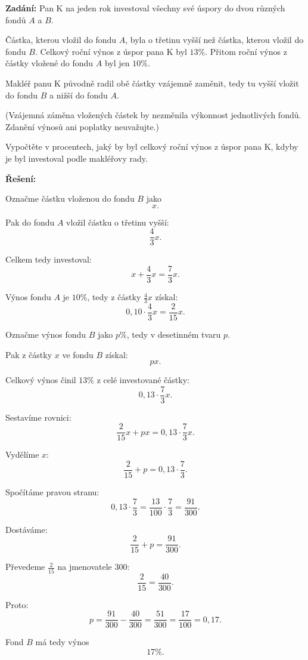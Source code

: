 \documentclass[12pt,a4paper]{article}
\begin{document}
\textbf{Zadání:}  
Pan K na jeden rok investoval všechny své úspory do dvou různých fondů \(A\) a \(B\).

Částka, kterou vložil do fondu \(A\), byla o třetinu vyšší než částka, kterou vložil do fondu \(B\).  
Celkový roční výnos z úspor pana K byl \(13\%\). Přitom roční výnos z částky vložené do fondu \(A\) byl jen \(10\%\).

Makléř panu K původně radil obě částky vzájemně zaměnit, tedy tu vyšší vložit do fondu \(B\) a nižší do fondu \(A\).

(Vzájemná záměna vložených částek by nezměnila výkonnost jednotlivých fondů. Zdanění výnosů ani poplatky neuvažujte.)

Vypočtěte v procentech, jaký by byl celkový roční výnos z úspor pana K, kdyby je byl investoval podle makléřovy rady.

\bigskip

\textbf{Řešení:}

Označme částku vloženou do fondu \(B\) jako
\[
x.
\]

Pak do fondu \(A\) vložil částku o třetinu vyšší:
\[
\frac{4}{3}x.
\]

Celkem tedy investoval:
\[
x+\frac{4}{3}x=\frac{7}{3}x.
\]

\medskip

Výnos fondu \(A\) je \(10\%\), tedy z částky \(\frac{4}{3}x\) získal:
\[
0{,}10\cdot \frac{4}{3}x=\frac{2}{15}x.
\]

Označme výnos fondu \(B\) jako \(p\%\), tedy v desetinném tvaru \(p\).

Pak z částky \(x\) ve fondu \(B\) získal:
\[
px.
\]

Celkový výnos činil \(13\%\) z celé investované částky:
\[
0{,}13\cdot \frac{7}{3}x.
\]

Sestavíme rovnici:
\[
\frac{2}{15}x + px = 0{,}13\cdot \frac{7}{3}x.
\]

Vydělíme \(x\):
\[
\frac{2}{15}+p = 0{,}13\cdot \frac{7}{3}.
\]

Spočítáme pravou stranu:
\[
0{,}13\cdot \frac{7}{3}=\frac{13}{100}\cdot \frac{7}{3}=\frac{91}{300}.
\]

Dostáváme:
\[
\frac{2}{15}+p=\frac{91}{300}.
\]

Převedeme \(\frac{2}{15}\) na jmenovatele 300:
\[
\frac{2}{15}=\frac{40}{300}.
\]

Proto:
\[
p=\frac{91}{300}-\frac{40}{300}=\frac{51}{300}=\frac{17}{100}=0{,}17.
\]

Fond \(B\) má tedy výnos
\[
17\%.
\]
\end{document}
